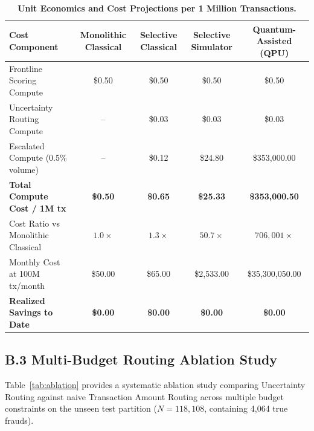 \documentclass[10pt,a4paper]{article}
\begin{document}
\vspace{-2pt}
\begin{table}[h!]
\centering
\renewcommand{\arraystretch}{0.76}
\caption{\textbf{Unit Economics and Cost Projections per 1 Million Transactions.}}
\label{tab:econ_bench}
\vspace{1pt}
\begin{tabularx}{\linewidth}{@{}lcccc@{}}
\toprule
\textbf{Cost Component} & \textbf{Monolithic Classical} & \textbf{Selective Classical} & \textbf{Selective Simulator} & \textbf{Quantum-Assisted (QPU)} \\
\midrule
Frontline Scoring Compute & \$0.50 & \$0.50 & \$0.50 & \$0.50 \\
Uncertainty Routing Compute & -- & \$0.03 & \$0.03 & \$0.03 \\
Escalated Compute (0.5\% volume) & -- & \$0.12 & \$24.80 & \$353,000.00 \\
\textbf{Total Compute Cost / 1M tx} & \textbf{\$0.50} & \textbf{\$0.65} & \textbf{\$25.33} & \textbf{\$353,000.50} \\
Cost Ratio vs Monolithic Classical & $1.0\times$ & $1.3\times$ & $50.7\times$ & $706,001\times$ \\
Monthly Cost at 100M tx/month & \$50.00 & \$65.00 & \$2,533.00 & \$35,300,050.00 \\
\midrule
\textbf{Realized Savings to Date} & \textbf{\$0.00} & \textbf{\$0.00} & \textbf{\$0.00} & \textbf{\$0.00} \\
\bottomrule
\end{tabularx}
\end{table}
\vspace{-5pt}

\subsection*{B.3 Multi-Budget Routing Ablation Study}
Table~\ref{tab:ablation} provides a systematic ablation study comparing Uncertainty Routing against naive Transaction Amount Routing across multiple budget constraints on the unseen test partition ($N=118,108$, containing 4,064 true frauds).
\end{document}

